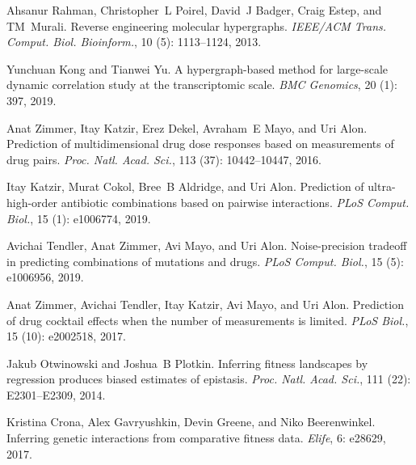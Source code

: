 Ahsanur Rahman, Christopher~L Poirel, David~J Badger, Craig Estep, and
TM~Murali.
\newblock Reverse engineering molecular hypergraphs.
\newblock \emph{IEEE/ACM Trans. Comput. Biol. Bioinform.}, 10
(5): 1113--1124, 2013.

Yunchuan Kong and Tianwei Yu.
\newblock A hypergraph-based method for large-scale dynamic correlation study
at the transcriptomic scale.
\newblock \emph{BMC Genomics}, 20 (1): 397, 2019.

Anat Zimmer, Itay Katzir, Erez Dekel, Avraham~E Mayo, and Uri Alon.
\newblock Prediction of multidimensional drug dose responses based on
measurements of drug pairs.
\newblock \emph{Proc. Natl. Acad. Sci.}, 113 (37):
10442--10447, 2016.

Itay Katzir, Murat Cokol, Bree~B Aldridge, and Uri Alon.
\newblock Prediction of ultra-high-order antibiotic combinations based on
pairwise interactions.
\newblock \emph{PLoS Comput. Biol.}, 15 (1): e1006774, 2019.

Avichai Tendler, Anat Zimmer, Avi Mayo, and Uri Alon.
\newblock Noise-precision tradeoff in predicting combinations of mutations and
drugs.
\newblock \emph{PLoS Comput. Biol.}, 15 (5): e1006956, 2019.

Anat Zimmer, Avichai Tendler, Itay Katzir, Avi Mayo, and Uri Alon.
\newblock Prediction of drug cocktail effects when the number of measurements
is limited.
\newblock \emph{PLoS Biol.}, 15 (10): e2002518, 2017.

Jakub Otwinowski and Joshua~B Plotkin.
\newblock Inferring fitness landscapes by regression produces biased estimates
of epistasis.
\newblock \emph{Proc. Natl. Acad. Sci.}, 111 (22):
E2301--E2309, 2014.

Kristina Crona, Alex Gavryushkin, Devin Greene, and Niko Beerenwinkel.
\newblock Inferring genetic interactions from comparative fitness data.
\newblock \emph{Elife}, 6: e28629, 2017.


